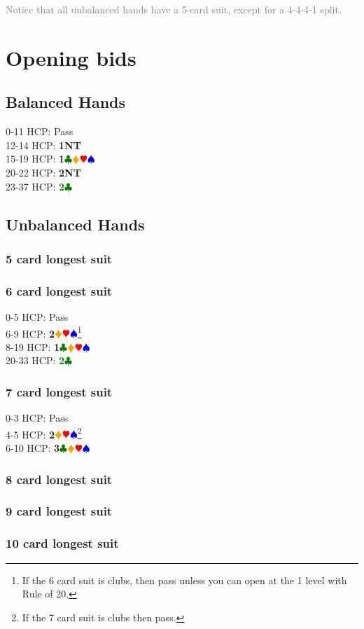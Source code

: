\documentclass{article}
\newcommand{\Hs}{\textcolor{Red}{$\varheart$}}
\newcommand{\Ss}{\textcolor{Blue}{$\spadesuit$}}
\newcommand{\Ds}{\textcolor{Orange}{$\vardiamond$}}
\newcommand{\Cs}{\textcolor{Green}{$\clubsuit$}}
\newcommand{\NTs}{\textbf{\footnotesize{NT}}}
\newcommand{\C}[1]{\textcolor{Green}{\textbf{#1}\Cs}}
\newcommand{\NT}[1]{\textbf{#1\NTs}}
\newcommand{\suits}[1]{\textbf{#1}\Cs\Ds\Hs\Ss}
\newcommand{\notclubs}[1]{\textbf{#1}\Ds\Hs\Ss}
\newcommand{\note}[1]{\textcolor{gray}{#1}}
\begin{document}
\note{Notice that all unbalanced hands have a 5-card suit, except for a 4-4-4-1 split.}

\section{Opening bids}

\subsection{Balanced Hands}

0-11 HCP: Pass\\
12-14 HCP: \NT{1}\\
15-19 HCP: \textbf{1}\Cs\Ds\Hs\Ss\\
20-22 HCP: \NT{2}\\
23-37 HCP: \C{2}

\subsection{Unbalanced Hands}
\subsubsection{5 card longest suit}
\subsubsection{6 card longest suit}
0-5 HCP: Pass \\
6-9 HCP: \notclubs{2}\footnote{If the 6 card suit is clubs, then pass unless you can open at the 1 level with Rule of 20.}\\
8-19 HCP: \suits{1}\\
20-33 HCP: \C{2}
\subsubsection{7 card longest suit}
0-3 HCP: Pass \\
4-5 HCP: \notclubs{2}\footnote{If the 7 card suit is clubs then pass.}\\
6-10 HCP: \suits{3}\\
\subsubsection{8 card longest suit}
\subsubsection{9 card longest suit}
\subsubsection{10 card longest suit}
\end{document}
